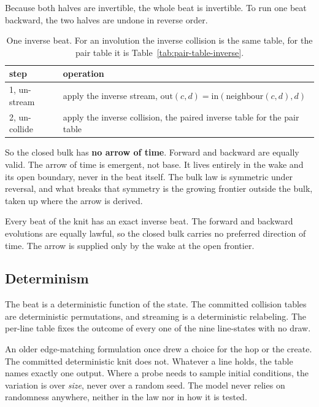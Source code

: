 Because both halves are invertible, the whole beat is invertible. To run one beat backward, the two halves are undone in reverse order.

\begin{table}[ht]
\centering
\begin{tabular}{@{}ll@{}}
\toprule
step & operation \\
\midrule
1, un-stream & apply the inverse stream, $\mathrm{out}(c, d) = \mathrm{in}(\mathrm{neighbour}(c, d), d)$ \\
2, un-collide & apply the inverse collision, the paired inverse table for the pair table \\
\bottomrule
\end{tabular}
\caption{One inverse beat. For an involution the inverse collision is the same table, for the pair table it is Table~\ref{tab:pair-table-inverse}.}
\label{tab:inverse-beat}
\end{table}

So the closed bulk has \textbf{no arrow of time}. Forward and backward are equally valid. The arrow of time is emergent, not base. It lives entirely in the wake and its open boundary, never in the beat itself. The bulk law is symmetric under reversal, and what breaks that symmetry is the growing frontier outside the bulk, taken up where the arrow is derived.

\begin{proposition}
Every beat of the knit has an exact inverse beat. The forward and backward evolutions are equally lawful, so the closed bulk carries no preferred direction of time. The arrow is supplied only by the wake at the open frontier.
\end{proposition}

\subsection{Determinism}

The beat is a deterministic function of the state. The committed collision tables are deterministic permutations, and streaming is a deterministic relabeling. The per-line table fixes the outcome of every one of the nine line-states with no draw.

An older edge-matching formulation once drew a choice for the hop or the create. The committed deterministic knit does not. Whatever a line holds, the table names exactly one output. Where a probe needs to sample initial conditions, the variation is over \emph{size}, never over a random seed. The model never relies on randomness anywhere, neither in the law nor in how it is tested.

